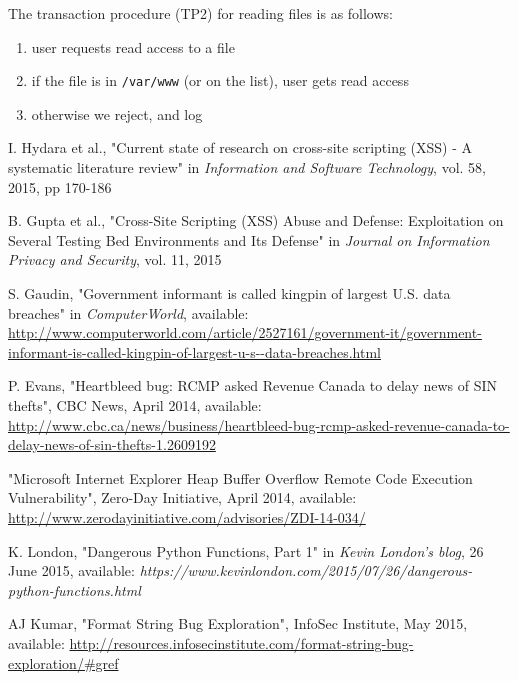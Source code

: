 \documentclass[11pt,journal]{article}
\begin{document}
	The transaction procedure (TP2) for reading files is as follows:
	\begin{enumerate}
		\item user requests read access to a file
		\item if the file is in \texttt{/var/www} (or on the list), user gets read access
		\item otherwise we reject, and log
	\end{enumerate}
	
	
	
	
	
	
\begin{thebibliography}{1}
	
	I. Hydara et al., "Current state of research on cross-site scripting (XSS) - A systematic literature review" in \emph{Information and Software Technology}, vol. 58, 2015, pp 170-186
	
	B. Gupta et al., "Cross-Site Scripting (XSS) Abuse and Defense: Exploitation on Several Testing Bed Environments and Its Defense" in \emph{Journal on Information Privacy and Security}, vol. 11, 2015
	
	S. Gaudin, "Government informant is called kingpin of largest U.S. data breaches" in \emph{ComputerWorld}, available:\\ \url{http://www.computerworld.com/article/2527161/government-it/government-informant-is-called-kingpin-of-largest-u-s--data-breaches.html}
	
	P. Evans, "Heartbleed bug: RCMP asked Revenue Canada to delay news of SIN thefts", CBC News, April 2014, available: \url{http://www.cbc.ca/news/business/heartbleed-bug-rcmp-asked-revenue-canada-to-delay-news-of-sin-thefts-1.2609192}
	
	"Microsoft Internet Explorer Heap Buffer Overflow Remote Code Execution Vulnerability", Zero-Day Initiative, April 2014, available: \url{http://www.zerodayinitiative.com/advisories/ZDI-14-034/}
	
	
	\cite{Kevin London}
	K. London, "Dangerous Python Functions, Part 1" in \emph{Kevin London's blog}, 26 June 2015, available: \emph{https://www.kevinlondon.com/2015/07/26/dangerous-python-functions.html}
	
	AJ Kumar, "Format String Bug Exploration", InfoSec Institute, May 2015, available: \url{http://resources.infosecinstitute.com/format-string-bug-exploration/#gref}
\end{thebibliography}
	
\end{document}
